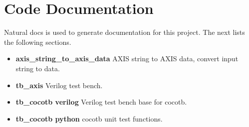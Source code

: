 \section{Code Documentation} \label{Code Documentation}

\par
Natural docs is used to generate documentation for this project. The next lists the following sections.

\begin{itemize}
\item \textbf{axis\_string\_to\_axis\_data} AXIS string to AXIS data, convert input string to data.\\
\item \textbf{tb\_axis} Verilog test bench.\\
\item \textbf{tb\_cocotb verilog} Verilog test bench base for cocotb.\\
\item \textbf{tb\_cocotb python} cocotb unit test functions.\\
\end{itemize}
